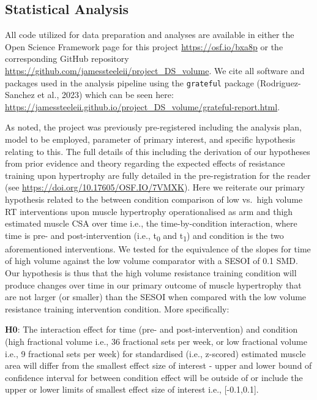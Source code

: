\documentclass[
]{article}
\begin{document}
\subsection{Statistical Analysis}\label{statistical-analysis}

All code utilized for data preparation and analyses are available in
either the Open Science Framework page for this project
\url{https://osf.io/bxa8p} or the corresponding GitHub repository
\url{https://github.com/jamessteeleii/project_DS_volume}. We cite all
software and packages used in the analysis pipeline using the
\texttt{grateful} package (Rodriguez-Sanchez et al., 2023) which can be
seen here:
\url{https://jamessteeleii.github.io/project_DS_volume/grateful-report.html}.

As noted, the project was previously pre-registered including the
analysis plan, model to be employed, parameter of primary interest, and
specific hypothesis relating to this. The full details of this including
the derivation of our hypotheses from prior evidence and theory
regarding the expected effects of resistance training upon hypertrophy
are fully detailed in the pre-registration for the reader (see
\url{https://doi.org/10.17605/OSF.IO/7VMXK}). Here we reiterate our
primary hypothesis related to the between condition comparison of low
vs.~high volume RT interventions upon muscle hypertrophy operationalised
as arm and thigh estimated muscle CSA over time i.e., the
time-by-condition interaction, where time is pre- and post-intervention
(i.e., t\textsubscript{0} and t\textsubscript{1}) and condition is the
two aforementioned interventions. We tested for the equivalence of the
slopes for time of high volume against the low volume comparator with a
SESOI of 0.1 SMD. Our hypothesis is thus that the high volume resistance
training condition will produce changes over time in our primary outcome
of muscle hypertrophy that are not larger (or smaller) than the SESOI
when compared with the low volume resistance training intervention
condition. More specifically:

\textbf{H0}: The interaction effect for time (pre- and
post-intervention) and condition (high fractional volume i.e., 36
fractional sets per week, or low fractional volume i.e., 9 fractional
sets per week) for standardised (i.e., z-scored) estimated muscle area
will differ from the smallest effect size of interest - upper and lower
bound of confidence interval for between condition effect will be
outside of or include the upper or lower limits of smallest effect size
of interest i.e., {[}-0.1,0.1{]}.
\end{document}
